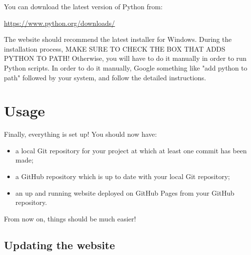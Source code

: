 \documentclass[a4paper,10pt]{article}
\begin{document}
You can download the latest version of Python from:

\url{https://www.python.org/downloads/}

The website should recommend the latest installer for Windows. During the installation process, MAKE SURE TO CHECK THE BOX THAT ADDS PYTHON TO PATH! Otherwise, you will have to do it manually in order to run Python scripts. In order to do it manually, Google something like "add python to path" followed by your system, and follow the detailed instructions.

\clearpage
\section{Usage}

Finally, everything is set up! You should now have:
\begin{itemize}
    \item a local Git repository for your project at which at least one commit has been made;
    \item a GitHub repository which is up to date with your local Git repository;
    \item an up and running website deployed on GitHub Pages from your GitHub repository.
\end{itemize}
From now on, things should be much easier! 

\subsection{Updating the website}
\end{document}
